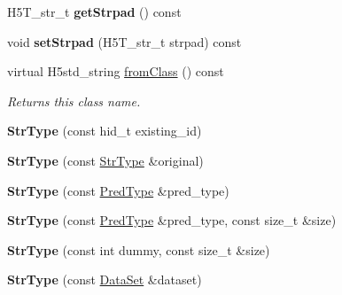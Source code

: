 \begin{DoxyCompactItemize}
H5\+T\+\_\+str\+\_\+t {\bfseries get\+Strpad} () const
\item 
\mbox{\label{class_h5_1_1_str_type_aa10bc9b281e625b501f9918474f3bba0}} 
void {\bfseries set\+Strpad} (H5\+T\+\_\+str\+\_\+t strpad) const
\item 
\mbox{\label{class_h5_1_1_str_type_acafed9b8354f9578341682e29b5b6712}} 
virtual H5std\+\_\+string \hyperlink{class_h5_1_1_str_type_acafed9b8354f9578341682e29b5b6712}{from\+Class} () const
\begin{DoxyCompactList}\small\item\em Returns this class name. \end{DoxyCompactList}\item 
\mbox{\label{class_h5_1_1_str_type_aa3311a639210adc42df22c341a639440}} 
{\bfseries Str\+Type} (const hid\+\_\+t existing\+\_\+id)
\item 
\mbox{\label{class_h5_1_1_str_type_a8253ae1e61897694436d8fdd2efea985}} 
{\bfseries Str\+Type} (const \hyperlink{class_h5_1_1_str_type}{Str\+Type} \&original)
\item 
\mbox{\label{class_h5_1_1_str_type_ad548b5d6a518c67428f6bf86bdd0c4d8}} 
{\bfseries Str\+Type} (const \hyperlink{class_h5_1_1_pred_type}{Pred\+Type} \&pred\+\_\+type)
\item 
\mbox{\label{class_h5_1_1_str_type_a502e6a4895bf51314204179e3f093a7f}} 
{\bfseries Str\+Type} (const \hyperlink{class_h5_1_1_pred_type}{Pred\+Type} \&pred\+\_\+type, const size\+\_\+t \&size)
\item 
\mbox{\label{class_h5_1_1_str_type_a46d838751b37805908051d8cd7ea07d5}} 
{\bfseries Str\+Type} (const int dummy, const size\+\_\+t \&size)
\item 
\mbox{\label{class_h5_1_1_str_type_aa4075d261048fb635b2e710a2f398d5e}} 
{\bfseries Str\+Type} (const \hyperlink{class_h5_1_1_data_set}{Data\+Set} \&dataset)
\item 
\mbox{\label{class_h5_1_1_str_type_a8a4924370c178bd00a82866ee1d4c3e2}} 

\end{DoxyCompactItemize}
